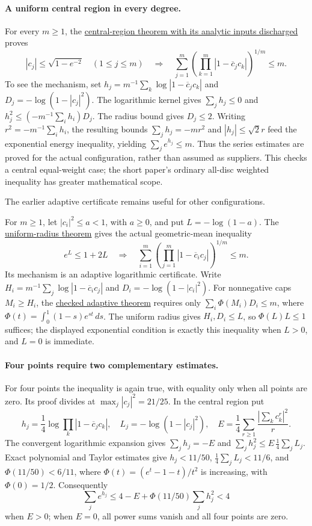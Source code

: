 \documentclass[11pt]{article}
\begin{document}
\paragraph{A uniform central region in every degree.}
For every $m\ge1$, the
\href{https://github.com/wcook04/plectis-erdos/blob/3be82b1a7340284aea72e9a5c8493cb020843921/ErdosProblems/Erdos1041/FreePointCentralCompletion.lean#L39}{central-region theorem with its analytic inputs discharged}
proves
\[
 |c_j|\le\sqrt{1-e^{-2}}\quad(1\le j\le m)
 \quad\Longrightarrow\quad
 \sum_{j=1}^m\left(\prod_{k=1}^m|1-\overline c_jc_k|\right)^{1/m}\le m.
\]
To see the mechanism, set
$h_j=m^{-1}\sum_k\log|1-\overline c_jc_k|$ and
$D_j=-\log(1-|c_j|^2)$.  The logarithmic kernel gives
$\sum_jh_j\le0$ and
$h_j^2\le(-m^{-1}\sum_i h_i)D_j$.  The radius bound gives $D_j\le2$.
Writing $r^2=-m^{-1}\sum_i h_i$, the resulting bounds
$\sum_jh_j=-mr^2$ and $|h_j|\le\sqrt2r$ feed the exponential energy
inequality, yielding $\sum_j e^{h_j}\le m$.  Thus the series estimates are
proved for the actual configuration, rather than assumed as suppliers.
This checks a central equal-weight case; the short paper's ordinary
all-disc weighted inequality has greater mathematical scope.

The earlier adaptive certificate remains useful for other configurations.

For $m\ge1$, let $|c_i|^2\le a<1$, with $a\ge0$, and put
$L=-\log(1-a)$. The
\href{https://github.com/wcook04/plectis-erdos/blob/457e0c74b2666f7fb2d825c967e49e439a600b23/ErdosProblems/Erdos1041/FreePointUniformRadius.lean#L84}{uniform-radius theorem}
gives the actual geometric-mean inequality
\[
 e^L\le1+2L\quad\Longrightarrow\quad
 \sum_{i=1}^m\left(\prod_{j=1}^m|1-\overline c_i c_j|\right)^{1/m}\le m.
\]
Its mechanism is an adaptive logarithmic certificate. Write
$H_i=m^{-1}\sum_j\log|1-\overline c_i c_j|$ and
$D_i=-\log(1-|c_i|^2)$. For nonnegative caps $M_i\ge H_i$, the
\href{https://github.com/wcook04/plectis-erdos/blob/0d34630e1cc9d2b1ac6edfa7cfdba83b31bdc8fe/ErdosProblems/Erdos1041/LogKernelCentralCertificate.lean#L99}{checked adaptive theorem}
requires only $\sum_i\Phi(M_i)D_i\le m$, where
$\Phi(t)=\int_0^1(1-s)e^{st}\,ds$.
The uniform radius gives $H_i,D_i\le L$, so $\Phi(L)L\le1$
suffices; the displayed exponential condition is exactly this inequality
when $L>0$, and $L=0$ is immediate.

\paragraph{Four points require two complementary estimates.}
For four points the inequality is again true, with equality only when all
points are zero.  Its proof divides at $\max_j|c_j|^2=21/25$.
In the central region put
\[
 h_j=\frac14\log\prod_k|1-\overline c_jc_k|,
 \quad L_j=-\log(1-|c_j|^2),\quad
 E=\frac14\sum_{r\ge1}\frac{|\sum_kc_k^r|^2}{r}.
\]
The convergent logarithmic expansion gives
$\sum_jh_j=-E$ and $\sum_jh_j^2\le E\,\frac14\sum_jL_j$.
Exact polynomial and Taylor estimates give $h_j<11/50$,
$\frac14\sum_jL_j<11/6$, and
$\Phi(11/50)<6/11$, where
$\Phi(t)=(e^t-1-t)/t^2$ is increasing, with $\Phi(0)=1/2$.
Consequently
\[
 \sum_je^{h_j}\le4-E+\Phi(11/50)\sum_jh_j^2<4
\]
when $E>0$; when $E=0$, all power sums vanish and all four points are zero.
\end{document}
